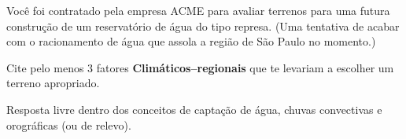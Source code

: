 \documentclass[letterpaper,portuguese,12pt,pdftex]{exam}
\begin{document}
\begin{questions}
\question[2]
Você foi contratado pela empresa ACME\circledR{} para avaliar terrenos para uma
futura construção de um reservatório de água do tipo represa.  (Uma tentativa de
acabar com o racionamento de água que assola a região de São Paulo no momento.)

Cite pelo menos 3 fatores {\bf Climáticos--regionais} que te levariam a
escolher um terreno apropriado.

\begin{solution}
Resposta livre dentro dos conceitos de captação de água, chuvas convectivas e
orográficas (ou de relevo).

\end{solution}

\end{questions}
\end{document}
